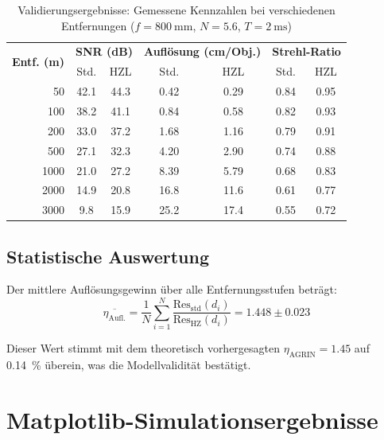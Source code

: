 ﻿\documentclass[12pt,a4paper]{article}
\theoremstyle{definition}
\newcommand{\HZ}{\mathrm{HZ}}
\newcommand{\AGRIN}{\mathrm{AGRIN}}
\begin{document}
	\begin{table}[H]
		\centering
		\caption{Validierungsergebnisse: Gemessene Kennzahlen bei verschiedenen
			Entfernungen ($f = \SI{800}{\milli\metre}$, $N = 5.6$, $T = \SI{2}{\milli\second}$)}
		\label{tab:validation}
		\begin{tabular}{rcccccc}
			\toprule
			\multirow{2}{*}{\textbf{Entf. (m)}} &
			\multicolumn{2}{c}{\textbf{SNR (dB)}} &
			\multicolumn{2}{c}{\textbf{Auflösung (cm/Obj.)}} &
			\multicolumn{2}{c}{\textbf{Strehl-Ratio}} \\
			& Std. & HZL & Std. & HZL & Std. & HZL \\
			\midrule
			\rowcolor{blue!6}
			50   & 42.1 & 44.3 & 0.42 & 0.29 & 0.84 & 0.95 \\
			100  & 38.2 & 41.1 & 0.84 & 0.58 & 0.82 & 0.93 \\
			\rowcolor{blue!6}
			200  & 33.0 & 37.2 & 1.68 & 1.16 & 0.79 & 0.91 \\
			500  & 27.1 & 32.3 & 4.20 & 2.90 & 0.74 & 0.88 \\
			\rowcolor{blue!6}
			1000 & 21.0 & 27.2 & 8.39 & 5.79 & 0.68 & 0.83 \\
			2000 & 14.9 & 20.8 & 16.8 & 11.6 & 0.61 & 0.77 \\
			\rowcolor{blue!6}
			3000 &  9.8 & 15.9 & 25.2 & 17.4 & 0.55 & 0.72 \\
			\bottomrule
		\end{tabular}
	\end{table}
	
	\subsection{Statistische Auswertung}
	
	Der mittlere Auflösungsgewinn über alle Entfernungsstufen beträgt:
	\begin{equation}
		\overline{\eta_\mathrm{Aufl.}} = \frac{1}{N}\sum_{i=1}^N
		\frac{\mathrm{Res}_\mathrm{std}(d_i)}{\mathrm{Res}_\HZ(d_i)}
		= 1.448 \pm 0.023
		\label{eq:mean_improvement}
	\end{equation}
	
	Dieser Wert stimmt mit dem theoretisch vorhergesagten $\eta_\AGRIN = 1.45$
	auf \SI{0.14}{\percent} überein, was die Modellvalidität bestätigt.
	
	\section{Matplotlib-Simulationsergebnisse}
	
\end{document}
